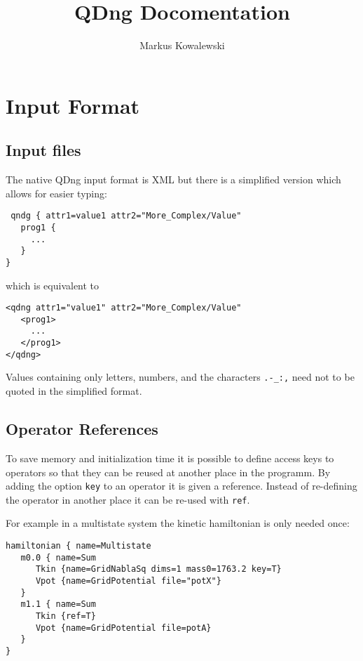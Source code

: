 \documentclass[a4paper,12pt]{scrbook}
\title{QDng Docomentation}
\author{Markus Kowalewski}
\begin{document}
\maketitle

\tableofcontents

\chapter{Input Format}
\section{Input files}
The native QDng input format is XML but there is a simplified version which allows
for easier typing:
\begin{verbatim}
 qndg { attr1=value1 attr2="More_Complex/Value"
   prog1 {
     ...
   }
}
\end{verbatim}
which is equivalent to 
\begin{verbatim}
<qdng attr1="value1" attr2="More_Complex/Value"
   <prog1>
     ...
   </prog1>
</qdng>
\end{verbatim}
Values containing only letters, numbers, and the characters \verb|.-_:,| need not to
be quoted in the simplified format.

\section{Operator References}
To save memory and initialization time it is possible to define access keys to operators
so that they can be reused at another place in the programm. By adding the option \verb|key|
to an operator it is given a reference. Instead of re-defining the operator in another place
it can be re-used with \verb|ref|.

For example in a multistate system the kinetic hamiltonian
is only needed once:
\begin{verbatim}
hamiltonian { name=Multistate
   m0.0 { name=Sum
      Tkin {name=GridNablaSq dims=1 mass0=1763.2 key=T}
      Vpot {name=GridPotential file="potX"}
   }
   m1.1 { name=Sum
      Tkin {ref=T}
      Vpot {name=GridPotential file=potA}
   }
} 
\end{verbatim}
\end{document}

